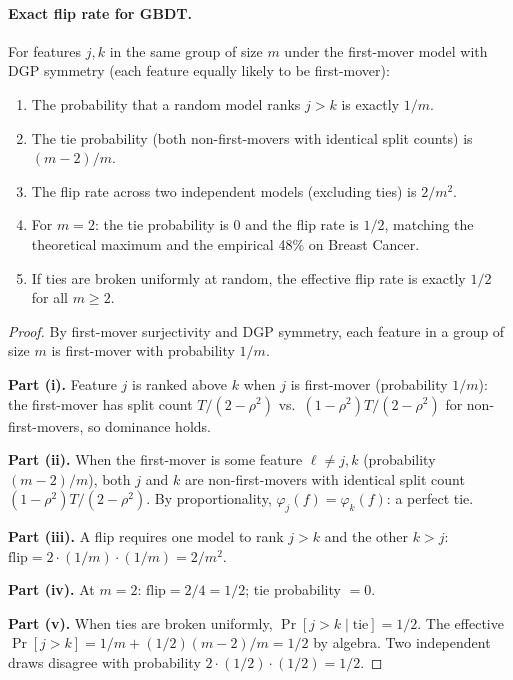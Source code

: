 \documentclass{jmlr}
\begin{document}
\paragraph{Exact flip rate for GBDT.}
\begin{proposition}
\label{prop:exact-flip}
For features $j, k$ in the same group of size $m$ under the first-mover model with DGP symmetry (each feature equally likely to be first-mover):
\begin{enumerate}
    \item[(i)] The probability that a random model ranks $j > k$ is exactly $1/m$.
    \item[(ii)] The tie probability (both non-first-movers with identical split counts) is $(m-2)/m$.
    \item[(iii)] The flip rate across two independent models (excluding ties) is $2/m^2$.
    \item[(iv)] For $m = 2$: the tie probability is $0$ and the flip rate is $1/2$, matching the theoretical maximum and the empirical 48\% on Breast Cancer.
    \item[(v)] If ties are broken uniformly at random, the effective flip rate is exactly $1/2$ for all $m \geq 2$.
\end{enumerate}
\end{proposition}

\begin{proof}
By first-mover surjectivity and DGP symmetry, each feature in a group of size $m$ is first-mover with probability $1/m$.

\textbf{Part (i).} Feature $j$ is ranked above $k$ when $j$ is first-mover (probability $1/m$): the first-mover has split count $T/(2-\rho^2)$ vs.\ $(1-\rho^2)T/(2-\rho^2)$ for non-first-movers, so dominance holds.

\textbf{Part (ii).} When the first-mover is some feature $\ell \neq j, k$ (probability $(m-2)/m$), both $j$ and $k$ are non-first-movers with identical split count $(1-\rho^2)T/(2-\rho^2)$. By proportionality, $\varphi_j(f) = \varphi_k(f)$: a perfect tie.

\textbf{Part (iii).} A flip requires one model to rank $j > k$ and the other $k > j$: $\text{flip} = 2 \cdot (1/m) \cdot (1/m) = 2/m^2$.

\textbf{Part (iv).} At $m=2$: $\text{flip} = 2/4 = 1/2$; tie probability $= 0$.

\textbf{Part (v).} When ties are broken uniformly, $\Pr[j > k \mid \text{tie}] = 1/2$. The effective $\Pr[j > k] = 1/m + (1/2)(m-2)/m = 1/2$ by algebra. Two independent draws disagree with probability $2 \cdot (1/2) \cdot (1/2) = 1/2$.
\end{proof}
\end{document}
